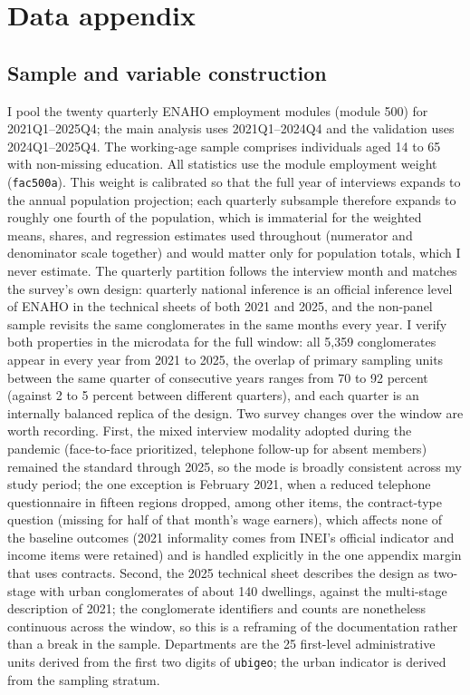 \section{Data appendix}\label{app:data}

\subsection{Sample and variable construction}

I pool the twenty quarterly ENAHO employment modules (module 500) for 2021Q1--2025Q4;
the main analysis uses 2021Q1--2024Q4 and the validation uses 2024Q1--2025Q4. The
working-age sample comprises individuals aged 14 to 65 with non-missing education. All
statistics use the module employment weight (\texttt{fac500a}). This weight is
calibrated so that the full year of interviews expands to the annual population
projection; each quarterly subsample therefore expands to roughly one fourth of the
population, which is immaterial for the weighted means, shares, and regression
estimates used throughout (numerator and denominator scale together) and would matter
only for population totals, which I never estimate. The quarterly partition follows
the interview month and matches the survey's own design: quarterly national inference
is an official inference level of ENAHO in the technical sheets of both 2021 and 2025,
and the non-panel sample revisits the same conglomerates in the same months every
year. I verify both properties in the microdata for the full window: all 5{,}359
conglomerates appear in every year from 2021 to 2025, the overlap of primary sampling
units between the same quarter of consecutive years ranges from 70 to 92 percent
(against 2 to 5 percent between different quarters), and each quarter is an
internally balanced replica of the design. Two survey changes over the window are
worth recording. First, the mixed interview modality adopted during the pandemic
(face-to-face prioritized, telephone follow-up for absent members) remained the
standard through 2025, so the mode is broadly consistent across my study period; the
one exception is February 2021, when a reduced telephone questionnaire in fifteen
regions dropped, among other items, the contract-type question (missing for half of
that month's wage earners), which affects none of the baseline outcomes (2021
informality comes from INEI's official indicator and income items were retained) and
is handled explicitly in the one appendix margin that uses contracts. Second, the
2025 technical sheet describes the design as two-stage with urban conglomerates of
about 140 dwellings, against the multi-stage description of 2021; the conglomerate
identifiers and counts are nonetheless continuous across the window, so this is a
reframing of the documentation rather than a break in the sample. Departments are the 25
first-level administrative units derived from the first two digits of \texttt{ubigeo};
the urban indicator is derived from the sampling stratum.

